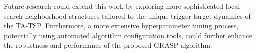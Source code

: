 Future research could extend this work by exploring more sophisticated local search neighborhood structures tailored to the unique trigger-target dynamics of the TA-TSP. Furthermore, a more extensive hyperparameter tuning process, potentially using automated algorithm configuration tools, could further enhance the robustness and performance of the proposed GRASP algorithm.
